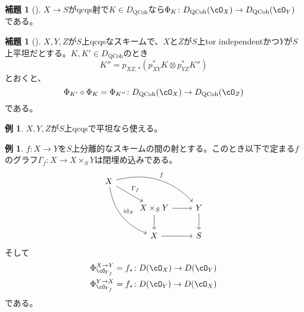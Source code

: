 \documentclass[uplatex, a4paper, dvipdfmx]{jsarticle}
\theoremstyle{definition}
\newtheorem{lemma}[theorem]{補題}
\newtheorem{example}[theorem]{例}
\DeclareMathOperator{\id}{\mathrm{id}}
\DeclareMathOperator{\QCoh}{\mathrm{QCoh}}
\begin{document}
\begin{lemma}[{\cite[\href{https://stacks.math.columbia.edu/tag/0FYR}{Tag 0FYR}]{stacks-project}}]
    $X \to S$がqcqs射で$K \in D_{\QCoh}$なら$\Phi_K \colon D_{\QCoh}(\cO_X) \to D_{\QCoh}(\cO_Y)$である。
\end{lemma}
\begin{lemma}[{\cite[\href{https://stacks.math.columbia.edu/tag/0FYS}{Tag 0FYS}]{stacks-project}}]
    $X, Y, Z$が$S$上qcqsなスキームで、$X$と$Z$が$S$上tor independentかつ$Y$が$S$上平坦だとする。$K, K' \in D_{\QCoh}$のとき
    \begin{equation}
        K'' = p_{XZ,*}(p_{XY}^*K \otimes p_{YZ}^*K'')
    \end{equation}
    とおくと、
    \begin{equation}
        \Phi_{K'} \circ \Phi_K = \Phi_{K''}\colon D_{\QCoh}(\cO_X) \to D_{\QCoh}(\cO_Z)
    \end{equation}
    である。
\end{lemma}
\begin{example}\label{ex:composition-of-Fourier-Mukai-over-field}
    $X, Y, Z$が$S$上qcqsで平坦なら使える。
\end{example}
\begin{example}\label{ex:push-pull-as-Fourier-Mukai}
    $f \colon X \to Y$を$S$上分離的なスキームの間の射とする。このとき以下で定まる$f$のグラフ$\Gamma_f \colon X \to X \times_S Y$は閉埋め込みである。
    \[
        \begin{tikzcd}
            X \ar[rd, "\Gamma_f"] \ar[rdd, bend right, "\id_X"] \ar[rrd, bend left, "f"]& & \\
            & X \times_S Y \ar[r] \ar[d] & Y \ar[d]\\
            & X            \ar[r]        & S
        \end{tikzcd}
    \]
    そして
    \begin{align}
        \Phi_{\cO_{\Gamma_f}}^{X \to Y} = f_* & \colon D(\cO_X) \to D(\cO_Y) \\
        \Phi_{\cO_{\Gamma_f}}^{Y \to X} = f_* & \colon D(\cO_Y) \to D(\cO_X)
    \end{align}
    である。
\end{example}
\end{document}
